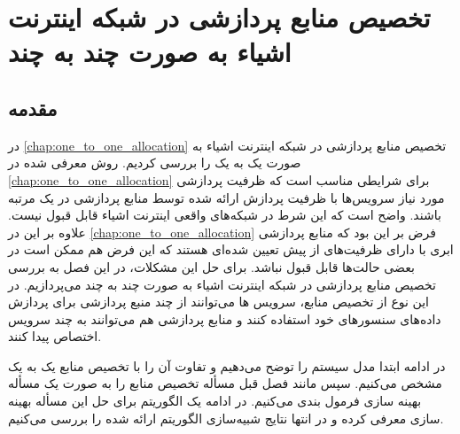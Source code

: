 \chapter{تخصیص منابع پردازشی در شبکه اینترنت اشیاء به صورت چند به چند}\label{Chap:many_to_many_allocation}
  \thispagestyle{empty}
  \section{مقدمه}
    در \cref{chap:one_to_one_allocation} تخصیص منابع پردازشی در شبکه اینترنت اشیاء به صورت یک به یک را بررسی کردیم.
    روش معرفی شده در \cref{chap:one_to_one_allocation} برای شرایطی مناسب است که ظرفیت پردازشی مورد نیاز سرویس‌ها با ظرفیت پردازش ارائه شده توسط منابع پردازشی در یک مرتبه باشند.
    واضح است که این شرط در شبکه‌‌های واقعی اینترنت اشیاء قابل قبول نیست.
    علاوه بر این در \cref{chap:one_to_one_allocation} فرض بر این بود که منابع پردازشی ابری با دارای ظرفیت‌های از پیش تعیین شده‌ای هستند که این فرض هم ممکن است در بعضی حالت‌ها قابل قبول نباشد.
    برای حل این مشکلات،‌ در این فصل به بررسی تخصیص منابع پردازشی در شبکه اینترنت اشیاء به صورت چند به چند می‌پردازیم.
    در این نوع از تخصیص منابع، سرویس ها می‌توانند از چند منبع پردازشی برای پردازش داده‌های سنسور‌های خود استفاده کنند و منابع پردازشی هم می‌توانند به چند سرویس اختصاص پیدا کنند.

    در ادامه ابتدا مدل سیستم را توضح می‌دهیم و تفاوت آن را با تخصیص منابع یک به یک مشخص می‌کنیم.
    سپس مانند فصل قبل مسأله تخصیص منابع را به صورت یک مسأله بهینه سازی فرمول بندی می‌کنیم.
    در ادامه یک الگوریتم برای حل این مسأله بهینه سازی معرفی کرده و در انتها نتایج شبیه‌سازی الگوریتم ارائه شده را بررسی می‌کنیم.
